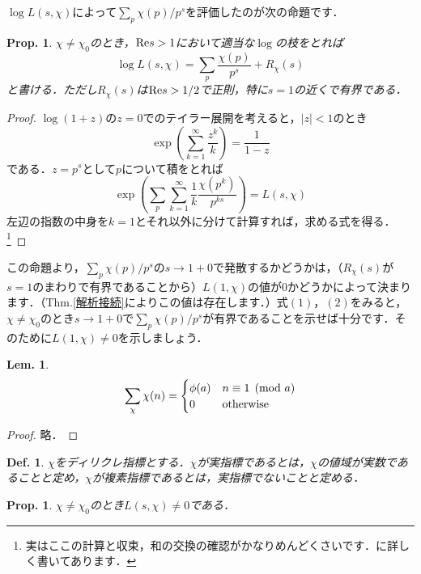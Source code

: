 \documentclass[dvipdfmx,b5paper,papersize]{jsarticle}
\newtheorem{prop}[thm]{Prop.}
\newtheorem{defi}[thm]{Def.}
\newtheorem{lem}[thm]{Lem.}
\begin{document}
$\log L(s,\chi)$によって$\sum_p {\chi(p)}/{p^s}$を評価したのが次の命題です．
\begin{prop} \label{log}
$\chi \neq \chi_{0}$のとき，${\rm Re}s>1$において適当な$\log$の枝をとれば
\[
\log L(s,\chi)=\sum_p \frac{\chi(p)}{p^s}+R_{\chi}(s)
\]
と書ける．ただし$R_{\chi}(s)$は${\rm Re}s>1/2$で正則，特に$s=1$の近くで有界である．
\end{prop}
\begin{proof}
$\log (1+z)$の$z=0$でのテイラー展開を考えると，$|z|<1$のとき
\[
\exp \left(\sum_{k=1}^{\infty} \frac{z^k}{k}\right)=\frac{1}{1-z}
\]
である．$z=p^s$として$p$について積をとれば
\[
\exp \left(\sum_{p} \sum_{k=1}^{\infty} \frac{1}{k} \frac{\chi(p^k)}{p^{ks}} \right)=L(s,\chi)
\]
左辺の指数の中身を$k=1$とそれ以外に分けて計算すれば，求める式を得る．\footnote{実はここの計算と収束，和の交換の確認がかなりめんどくさいです．\cite{雪江}に詳しく書いてあります．}
\end{proof}
この命題より，$\sum_p {\chi(p)}/{p^s}$の$s \to 1+0$で発散するかどうかは，（$R_{\chi}(s)$が$s=1$のまわりで有界であることから）$L(1,\chi)$の値が$0$かどうかによって決まります．（Thm.\ref{解析接続}によりこの値は存在します．）式$(1)$，$(2)$をみると，$\chi \neq \chi_{0}$のとき$s \to 1+0$で$\sum_p {\chi(p)}/{p^s}$が有界であることを示せば十分です．そのために$L(1,\chi) \neq 0$を示しましょう．
\begin{lem} \label{フーリエ}
\[
\sum_{\chi} \chi(n)=\begin{cases}
\phi(a) & n \equiv 1\pmod{a}\\
0 & {\rm otherwise}\\
\end{cases}
\]
\end{lem}
\begin{proof}
略．
\end{proof}
\begin{defi}
$\chi$をディリクレ指標とする．$\chi$が実指標であるとは，$\chi$の値域が実数であることと定め，$\chi$が複素指標であるとは，実指標でないことと定める．
\end{defi}
\begin{prop}
$\chi \neq \chi_{0}$のとき$L(s,\chi)\neq 0$である．
\end{prop}
\end{document}
